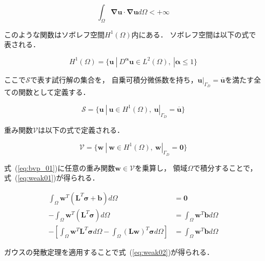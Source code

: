 \begin{equation}
  \label{nabra_u_inf}
  \int_\Omega \boldsymbol{\nabla} \boldsymbol{u}\cdot\boldsymbol{\nabla} \boldsymbol{u}d\Omega<+\infty
\end{equation}

\noindent
このような関数はソボレフ空間$H^1(\Omega)$内にある．
ソボレフ空間は以下の式で表される．

\begin{equation}
  \label{sovolev}
  H^1(\Omega)=\{\boldsymbol{u}\ |\ D^{\boldsymbol\alpha}\boldsymbol{u}\in L^2(\Omega),\ |\boldsymbol{\alpha}\le1\}
\end{equation}

\noindent
ここで$\mathcal{S}$で表す試行解の集合を，
自乗可積分微係数を持ち，$\boldsymbol{u}|_{\Gamma_D}=\overline{\boldsymbol{u}}$を満たす全ての関数として定義する．

\begin{equation}
  \label{S_trial_sol}
  \mathcal{S}=\{\boldsymbol{u}\ |\ \boldsymbol{u}\in H^1(\Omega),\ \boldsymbol{u}|_{\Gamma_D}=\overline{\boldsymbol{u}}\}
\end{equation}

\noindent
重み関数$\mathcal{V}$は以下の式で定義される．

\begin{equation}
  \label{V_trial_sol}
  \mathcal{V}=\{\boldsymbol{w}\ |\ \boldsymbol{w}\in H^1(\Omega),\ \boldsymbol{w}|_{\Gamma_D}=\boldsymbol{0}\}
\end{equation}

\noindent
式~(\ref{eq:bvp_01})に任意の重み関数$\boldsymbol{w}\in\mathcal{V}$を乗算し，
領域$\Omega$で積分することで，式~(\ref{eq:weak01})が得られる．

\begin{align}
  \int_\Omega \boldsymbol{w}^T (\boldsymbol{L}^T\boldsymbol{\sigma} + \boldsymbol{b}) d\Omega &= \boldsymbol{0} \nonumber \\
  -\int_\Omega \boldsymbol{w}^T (\boldsymbol{L}^T\boldsymbol{\sigma}) d\Omega &= \int_\Omega \boldsymbol{w}^T \boldsymbol{b} d\Omega\nonumber \\
  \label{eq:weak01}
  -\left[\int_\Omega \boldsymbol{w}^T\boldsymbol{L}^T\boldsymbol{\sigma} d\Omega - \int_\Omega (\boldsymbol{L}\boldsymbol{w})^T \boldsymbol{\sigma} d\Omega \right] &= \int_\Omega \boldsymbol{w}^T \boldsymbol{b} d\Omega
\end{align}

\noindent
ガウスの発散定理を適用することで式~(\ref{eq:weak02})が得られる．

